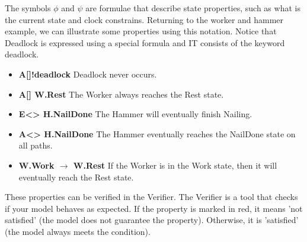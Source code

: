 The symbols $\phi$ and $\psi$ are formulae that describe state properties, such as what is the current state and clock constrains. Returning to the worker and hammer example, we can illustrate some properties using this notation. Notice that Deadlock is expressed using a special formula and IT consists of the keyword deadlock. 

\begin{itemize}
    \item \textbf{A[]!deadlock} Deadlock never occurs.

    \item \textbf{A[] W.Rest} The Worker always reaches the Rest state.

    \item \textbf{E<> H.NailDone} The Hammer will eventually finish Nailing.

    \item  \textbf{A<> H.NailDone} The Hammer eventually reaches the NailDone state on all paths.

    \item \textbf{W.Work $\longrightarrow$ W.Rest} If the Worker is in the Work state, then it will eventually reach the Rest state.
\end{itemize}

These properties can be verified in the Verifier. The Verifier is a tool that checks if your model behaves as expected. If the property is marked in red, it means 'not satisfied' (the model does not guarantee the property). Otherwise, it is 'satisfied' (the model always meets the condition).






